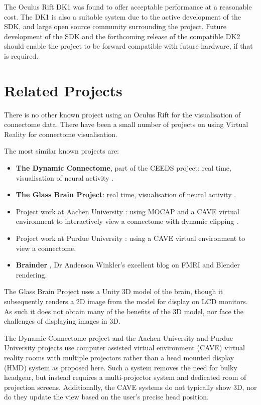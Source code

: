 \documentclass[MSc,paper=a4,pagesize=auto]{icldt}
\begin{document}
The Oculus Rift DK1 was found to offer acceptable performance at a reasonable cost. The DK1 is also a suitable system due to the active development of the SDK, and large open source community surrounding the project. Future development of the SDK and the forthcoming release of the compatible DK2 should enable the project to be forward compatible with future hardware, if that is required.
\section{Related Projects}
There is no other known project using an Oculus Rift for the visualisation of connectome data. There have been a small number of projects on using Virtual Reality for connectome visualisation. 

The most similar known projects are:
\begin{itemize}
  \item \textbf{The Dynamic Connectome}, part of the CEEDS project: real time, visualisation of neural activity \cite{ceeds2014}.
  \item \textbf{The Glass Brain Project}: real time, visualisation of neural activity \cite{GlassBrain2014}.
  \item Project work at Aachen University \cite{Rick2011}: using MOCAP and a CAVE virtual environment to interactively view a connectome with dynamic clipping \cite{ceeds2014}.
  \item Project work at Purdue University \cite{Chen2011}: using a CAVE virtual environment to view a connectome.
  \item \textbf{Brainder} \cite{brainder2014}, Dr Anderson Winkler’s excellent blog on FMRI and Blender rendering.
\end{itemize}

The Glass Brain Project uses a Unity 3D model of the brain, though it subsequently renders a 2D image from the model for display on LCD monitors. As such it does not obtain many of the benefits of the 3D model, nor face the challenges of displaying images in 3D.

The Dynamic Connectome project and the Aachen University and Purdue University projects use computer assisted virtual environment (CAVE) virtual reality rooms with multiple projectors rather than a head mounted display (HMD) system as proposed here. Such a system removes the need for bulky headgear, but instead requires a multi-projector system and dedicated room of projection screens. Additionally, the CAVE systems do not typically show 3D, nor do they update the view based on the user’s precise head position.
\end{document}
